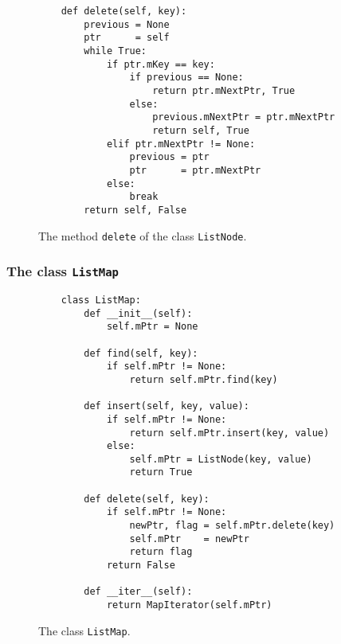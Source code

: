 \begin{figure}[!ht]
\centering
\begin{verbatim}
    def delete(self, key):
        previous = None
        ptr      = self
        while True:
            if ptr.mKey == key:
                if previous == None:
                    return ptr.mNextPtr, True
                else:
                    previous.mNextPtr = ptr.mNextPtr
                    return self, True
            elif ptr.mNextPtr != None:
                previous = ptr
                ptr      = ptr.mNextPtr
            else:
                break
        return self, False
\end{verbatim}
\vspace*{-0.3cm}
\caption{The method \texttt{delete} of the class \texttt{ListNode}.}
\label{fig:ListNode.ipynb:delete}
\end{figure}
\subsubsection{The class \texttt{ListMap}}
\begin{figure}[!ht]
\centering
\begin{verbatim}
    class ListMap:
        def __init__(self):
            self.mPtr = None
            
        def find(self, key):
            if self.mPtr != None:
                return self.mPtr.find(key)
            
        def insert(self, key, value):
            if self.mPtr != None:
                return self.mPtr.insert(key, value)
            else:
                self.mPtr = ListNode(key, value)
                return True
                
        def delete(self, key):
            if self.mPtr != None:
                newPtr, flag = self.mPtr.delete(key)
                self.mPtr    = newPtr
                return flag
            return False
                
        def __iter__(self):
            return MapIterator(self.mPtr)
\end{verbatim}
\vspace*{-0.3cm}
\caption{The class \texttt{ListMap}.}
\label{fig:ListMap.ipynb}
\end{figure}

